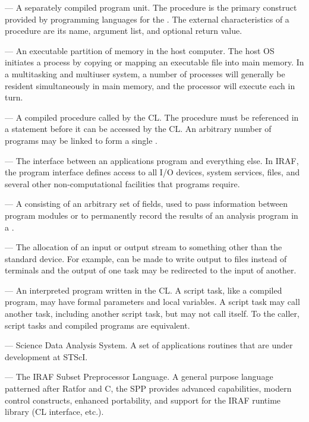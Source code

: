 \medskip \noindent {} --- A separately compiled program unit.
The procedure is the primary construct provided by programming languages for
the .
The external characteristics of a procedure are its name, argument list,
and optional return value.

\medskip \noindent {} --- An executable partition of 
memory in the host computer.
The host OS initiates a process by copying or mapping an executable file
into main memory. In a multitasking and multiuser system, a number of processes
will generally be resident simultaneously in main memory,
and the processor will execute each in turn.

\medskip \noindent {} --- A compiled procedure called by the
CL. The procedure must be referenced in a  statement before it
can be accessed by the CL.  An arbitrary number of programs may be 
linked to form a single .

\medskip \noindent {} --- The interface between an
applications program and everything else.  In IRAF, the program interface
defines access to all I/O devices, system services, files, and several
other non-computational facilities that pro\-grams require.

\medskip \noindent {} --- A  consisting
of an arbitrary set of fields, used to pass information between program modules
or to permanently record the results of an analysis program in a
.

\medskip \noindent {} --- The allocation of an input or
output stream to something other than the standard device.  For example,
 can be made to write output to files instead of terminals
and the output of one task may be redirected to the input of another.

\medskip \noindent {} --- An interpreted program written
in the CL. A script task, like a compiled program, may have formal parameters
and local variables. A script task may call another task, including another
script task, but may not call itself.
To the caller, script tasks and compiled programs are equivalent.

\medskip \noindent {} --- Science Data Analysis System. A set
of applications routines that are under development at STScI.

\medskip \noindent {} --- The IRAF Subset Preprocessor Language.
A general purpose language patterned after Ratfor and C, the SPP provides
advanced capabilities, modern control constructs, enhanced portability,
and support for the IRAF runtime library (CL interface, etc.).

